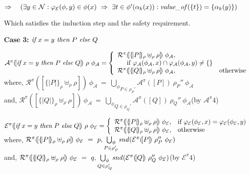 \documentclass[10pt,a4paper,final,oneside,fleqn]{book}
\begin{document}
\noindent
$\Rightarrow~~~(\exists y\in\mathcal{N}:\varphi_\mathcal{E}(\phi,y)\in\phi(x)~\Rightarrow~\exists t\in\phi'(\alpha_k(x)):\mbox{{\itshape value\_of\/}}(\{t\})=\{\alpha_k(y)\})$\vspace{5mm}

\noindent
Which satisfies the induction step and the safety requirement.\vspace{5mm}

\noindent
{\bf Case 3:} $\mbox{{\itshape if} }x=y\mbox{ {\itshape then} }P\mbox{ {\itshape else} }Q$\vspace{5mm}

\noindent
$\mathcal{A}^\pi(\![\mbox{{\itshape if} }x=y\mbox{ {\itshape then} }P\mbox{ {\itshape else} }Q]\!)~\rho~\phi_\mathcal{A}=\left\{\begin{array}{ll}{\mathcal R}^\pi(\![\{\!|P|\!\}_\rho\uplus_\rho\rho]\!)~\phi_\mathcal{A},&\\
\hspace{5mm}\mbox{if }\varphi_\mathcal{A}(\phi_\mathcal{A},x)\cap\varphi_\mathcal{A}(\phi_\mathcal{A},y)\ne\{\}&\\
{\mathcal R}^\pi(\![\{\!|Q|\!\}_\rho\uplus_\rho\rho]\!)~\phi_\mathcal{A},&\mbox{otherwise}\end{array}\right.$\\
where, ${\mathcal R}^\pi(\![\{\!|P|\!\}_\rho\uplus_\rho\rho]\!)~\phi_\mathcal{A}~=~\underset{P\in\rho_P'}{\bigcup_\phi}\mathcal{A}^\pi(\![P]\!)~\rho_P''~\phi_\mathcal{A}$\\and, ${\mathcal R}^\pi(\![\{\!|Q|\!\}_\rho\uplus_\rho\rho]\!)~\phi_\mathcal{A}~=~\underset{Q\in\rho_Q'}{\bigcup_\phi}\mathcal{A}^\pi(\![Q]\!)~\rho_Q''~\phi_\mathcal{A}$\hfill(by $\mathcal{A}^{\pi}4$)\vspace{5mm}

\noindent $\mathcal{E}^\pi(\![\mbox{{\itshape if} }x=y\mbox{ {\itshape then} }P\mbox{ {\itshape else} }Q]\!)~\rho~\phi_\mathcal{E}=\left\{\begin{array}{ll}{\mathcal R}^\pi(\![\{\!|P|\!\}_\rho\uplus_\rho\rho]\!)~\phi_\mathcal{E},&\mbox{if }\varphi_\mathcal{E}(\phi_\mathcal{E},x)=\varphi_\mathcal{E}(\phi_\mathcal{E},y)\\{\mathcal R}^\pi(\![\{\!|Q|\!\}_\rho\uplus_\rho\rho]\!)~\phi_\mathcal{E},&\mbox{otherwise}\end{array}\right.$\\
where, ${\mathcal R}^\pi(\![\{\!|P|\!\}_\rho\uplus_\rho\rho]\!)~\phi_\mathcal{E}~=~p,\underset{P\in\rho_P'}{\bigcup_\phi}\mbox{{\itshape snd\/}}(\mathcal{E}^\pi(\![P]\!)~\rho_P''~\phi_\mathcal{E})$\\and, ${\mathcal R}^\pi(\![\{\!|Q|\!\}_\rho\uplus_\rho\rho]\!)~\phi_\mathcal{E}~=~q,\underset{Q\in\rho_Q'}{\bigcup_\phi}\mbox{{\itshape snd\/}}(\mathcal{E}^\pi(\![Q]\!)~\rho_Q''~\phi_\mathcal{E})$\hfill(by $\mathcal{E}^{\pi}4$)\vspace{5mm}
\end{document}
